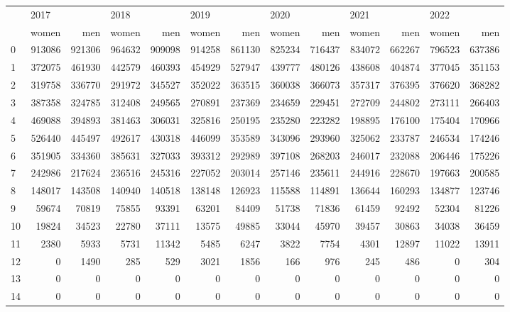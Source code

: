 \begin{tabular}{lrrrrrrrrrrrr}
\toprule
{} & \multicolumn{2}{l}{2017} & \multicolumn{2}{l}{2018} & \multicolumn{2}{l}{2019} & \multicolumn{2}{l}{2020} & \multicolumn{2}{l}{2021} & \multicolumn{2}{l}{2022} \\
{} &   women &     men &   women &     men &   women &     men &   women &     men &   women &     men &   women &     men \\
\midrule
0  &  913086 &  921306 &  964632 &  909098 &  914258 &  861130 &  825234 &  716437 &  834072 &  662267 &  796523 &  637386 \\
1  &  372075 &  461930 &  442579 &  460393 &  454929 &  527947 &  439777 &  480126 &  438608 &  404874 &  377045 &  351153 \\
2  &  319758 &  336770 &  291972 &  345527 &  352022 &  363515 &  360038 &  366073 &  357317 &  376395 &  376620 &  368282 \\
3  &  387358 &  324785 &  312408 &  249565 &  270891 &  237369 &  234659 &  229451 &  272709 &  244802 &  273111 &  266403 \\
4  &  469088 &  394893 &  381463 &  306031 &  325816 &  250195 &  235280 &  223282 &  198895 &  176100 &  175404 &  170966 \\
5  &  526440 &  445497 &  492617 &  430318 &  446099 &  353589 &  343096 &  293960 &  325062 &  233787 &  246534 &  174246 \\
6  &  351905 &  334360 &  385631 &  327033 &  393312 &  292989 &  397108 &  268203 &  246017 &  232088 &  206446 &  175226 \\
7  &  242986 &  217624 &  236516 &  245316 &  227052 &  203014 &  257146 &  235611 &  244916 &  228670 &  197663 &  200585 \\
8  &  148017 &  143508 &  140940 &  140518 &  138148 &  126923 &  115588 &  114891 &  136644 &  160293 &  134877 &  123746 \\
9  &   59674 &   70819 &   75855 &   93391 &   63201 &   84409 &   51738 &   71836 &   61459 &   92492 &   52304 &   81226 \\
10 &   19824 &   34523 &   22780 &   37111 &   13575 &   49885 &   33044 &   45970 &   39457 &   30863 &   34038 &   36459 \\
11 &    2380 &    5933 &    5731 &   11342 &    5485 &    6247 &    3822 &    7754 &    4301 &   12897 &   11022 &   13911 \\
12 &       0 &    1490 &     285 &     529 &    3021 &    1856 &     166 &     976 &     245 &     486 &       0 &     304 \\
13 &       0 &       0 &       0 &       0 &       0 &       0 &       0 &       0 &       0 &       0 &       0 &       0 \\
14 &       0 &       0 &       0 &       0 &       0 &       0 &       0 &       0 &       0 &       0 &       0 &       0 \\
\bottomrule
\end{tabular}

